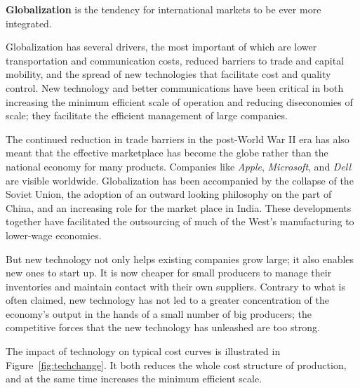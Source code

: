 \begin{DefBox}
	\textbf{Globalization} is the tendency for international markets to be ever more integrated.
\end{DefBox}

Globalization has several drivers, the most important of which are lower
transportation and communication costs, reduced barriers to trade and
capital mobility, and the spread of new technologies that facilitate cost
and quality control. New technology and better communications have been
critical in both increasing the minimum efficient scale of operation and
reducing diseconomies of scale; they facilitate the efficient management of
large companies.

The continued reduction in trade barriers in the post-World War II era has
also meant that the effective marketplace has become the globe rather than
the national economy for many products. Companies like \textit{Apple}, \textit{Microsoft}, and
\textit{Dell} are visible worldwide. Globalization has been accompanied by the
collapse of the Soviet Union, the adoption of an outward looking philosophy
on the part of China, and an increasing role for the market place in India.
These developments together have facilitated the outsourcing of much of the
West's manufacturing to lower-wage economies.

\newhtmlpage

But new technology not only helps existing companies grow large; it also
enables new ones to start up. It is now cheaper for small producers to
manage their inventories and maintain contact with their own suppliers.
Contrary to what is often claimed, new technology has not led to a greater
concentration of the economy's output in the hands of a small number of big
producers; the competitive forces that the new technology has unleashed are
too strong.

The impact of technology on typical cost curves is illustrated in Figure~\ref{fig:techchange}.
It both reduces the whole cost structure of production,
and at the same time increases the minimum efficient scale.

